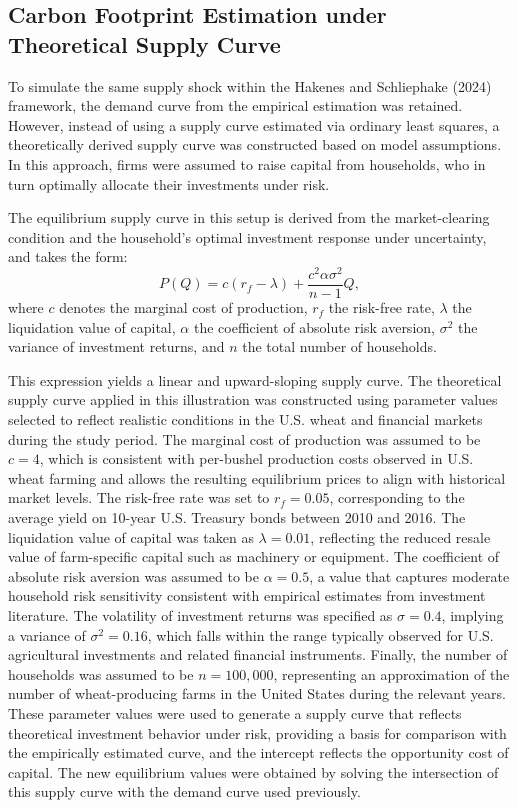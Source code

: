 \documentclass[12pt,a4paper]{article}%
\begin{document}
\subsection*{Carbon Footprint Estimation under Theoretical Supply Curve}

To simulate the same supply shock within the Hakenes and Schliephake (2024) framework, the demand curve from the empirical estimation was retained. However, instead of using a supply curve estimated via ordinary least squares, a theoretically derived supply curve was constructed based on model assumptions. In this approach, firms were assumed to raise capital from households, who in turn optimally allocate their investments under risk.

The equilibrium supply curve in this setup is derived from the market-clearing condition and the household's optimal investment response under uncertainty, and takes the form:
\[
P(Q) = c(r_f - \lambda) + \frac{c^2 \alpha \sigma^2}{n - 1} Q,
\]
where \( c \) denotes the marginal cost of production, \( r_f \) the risk-free rate, \( \lambda \) the liquidation value of capital, \( \alpha \) the coefficient of absolute risk aversion, \( \sigma^2 \) the variance of investment returns, and \( n \) the total number of households. 

This expression yields a linear and upward-sloping supply curve. The theoretical supply curve applied in this illustration was constructed using parameter values selected to reflect realistic conditions in the U.S. wheat and financial markets during the study period. The marginal cost of production was assumed to be $c = 4$, which is consistent with per-bushel production costs observed in U.S. wheat farming and allows the resulting equilibrium prices to align with historical market levels. The risk-free rate was set to $r_f = 0.05$, corresponding to the average yield on 10-year U.S. Treasury bonds between 2010 and 2016. The liquidation value of capital was taken as $\lambda = 0.01$, reflecting the reduced resale value of farm-specific capital such as machinery or equipment. The coefficient of absolute risk aversion was assumed to be $\alpha = 0.5$, a value that captures moderate household risk sensitivity consistent with empirical estimates from investment literature. The volatility of investment returns was specified as $\sigma = 0.4$, implying a variance of $\sigma^2 = 0.16$, which falls within the range typically observed for U.S. agricultural investments and related financial instruments. Finally, the number of households was assumed to be $n = 100{,}000$, representing an approximation of the number of wheat-producing farms in the United States during the relevant years. These parameter values were used to generate a supply curve that reflects theoretical investment behavior under risk, providing a basis for comparison with the empirically estimated curve, and the intercept reflects the opportunity cost of capital. The new equilibrium values were obtained by solving the intersection of this supply curve with the demand curve used previously.
\end{document}

